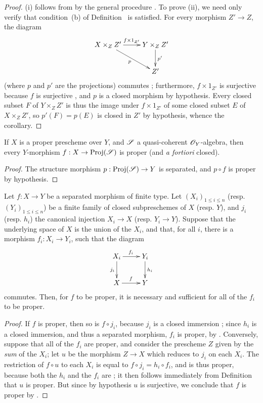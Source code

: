\begin{proof}
\label{proof-II.5.4.3}
(i) follows from  by the general procedure .
To prove (ii), we need only verify that condition~(b) of Definition~ is satisfied.
For every morphism $Z'\to Z$, the diagram
\[
  \xymatrix{
    X\times_Z Z'\ar[r]^{f\times1_{Z'}}\ar[dr]_p &
    Y\times_Z Z'\ar[d]^{p'}\\
    & Z'
  }
\]
(where $p$ and $p'$ are the projections) commutes ;
furthermore, $f\times1_{Z'}$ is surjective because $f$ is surjective , and $p$ is a closed morphism by hypothesis.
Every closed subset $F$ of $Y\times_Z Z'$ is thus the image under $f\times1_{Z'}$ of some closed subset $E$ of $X\times_Z Z'$, so $p'(F)=p(E)$ is closed in $Z'$ by hypothesis, whence the corollary.
\end{proof}

\begin{corollary}[5.4.4]
\label{II.5.4.4}
If $X$ is a proper prescheme over $Y$, and $\mathscr{S}$ a quasi-coherent $\mathscr{O}_Y$-algebra, then every $Y$-morphism $f:X\to\Proj(\sh{S})$ is proper (and \emph{a fortiori} closed).
\end{corollary}

\begin{proof}
\label{proof-II.5.4.4}
The structure morphism $p:\Proj(\sh{S})\to Y$ is separated, and $p\circ f$ is proper by hypothesis.
\end{proof}

\begin{corollary}[5.4.5]
\label{II.5.4.5}
Let $f:X\to Y$ be a separated morphism of finite type.
Let $(X_i)_{1\leq i\leq n}$ (resp. $(Y_i)_{1\leq i\leq n}$) be a finite family of closed subpreschemes of $X$ (resp. $Y$), and $j_i$ (resp. $h_i$) the canonical injection $X_i\to X$ (resp. $Y_i\to Y$).
Suppose that the underlying space of $X$ is the union of the $X_i$, and that, for all $i$, there is a morphism $f_i:X_i\to Y_i$, such that the diagram
\[
  \xymatrix{
    X_i\ar[r]^{f_i}\ar[d]_{j_i} &
    Y_i\ar[d]^{h_i}\\
    X\ar[r]^f &
    Y
  }
\]
commutes.
Then, for $f$ to be proper, it is necessary and sufficient for all of the $f_i$ to be proper.
\end{corollary}

\begin{proof}
\label{proof-II.5.4.5}
If $f$ is proper, then so is $f\circ j_i$, because $j_i$ is a closed immersion ;
since $h_i$ is a closed immersion, and thus a separated morphism, $f_i$ is proper, by .
Conversely, suppose that all of the $f_i$ are proper, and consider the prescheme $Z$ given by the \emph{sum} of the $X_i$; let $u$ be the morphism $Z\to X$ which reduces to $j_i$ on each $X_i$.
The restriction of $f\circ u$ to each $X_i$ is equal to $f\circ j_i=h_i\circ f_i$, and is thus proper, because both the $h_i$ and the $f_i$ are ;
it then follows immediately from Definition~ that $u$ is proper.
But since by hypothesis $u$ is surjective, we conclude that $f$ is proper by .
\end{proof}

